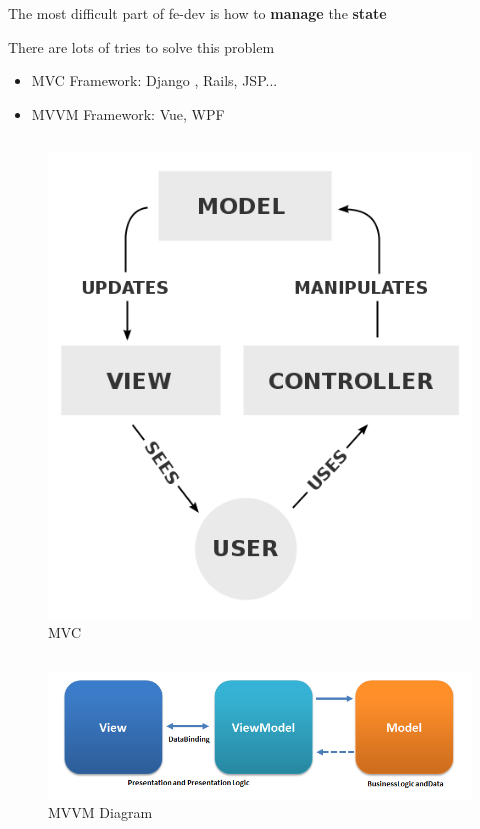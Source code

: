 \begin{frame}

    The most difficult part of fe-dev is how to \textbf{manage} the \textbf{state}

    There are lots of tries to solve  this problem

    \begin{itemize}
        \item MVC Framework: Django , Rails, JSP...
        \item MVVM Framework: Vue, WPF
    \end{itemize}

    \begin{columns}
        \begin{column}{.2\textwidth}
    \begin{figure}
        \includegraphics[width=\textwidth]{assets/MVC.png}
        \caption{MVC}
    \end{figure}
        \end{column}
    \end{columns}
\end{frame}
\begin{frame}
    \begin{figure}
        \includegraphics[width=.8\textwidth]{assets/MVVM.png}
        \caption{MVVM Diagram }
    \end{figure}

\end{frame}

